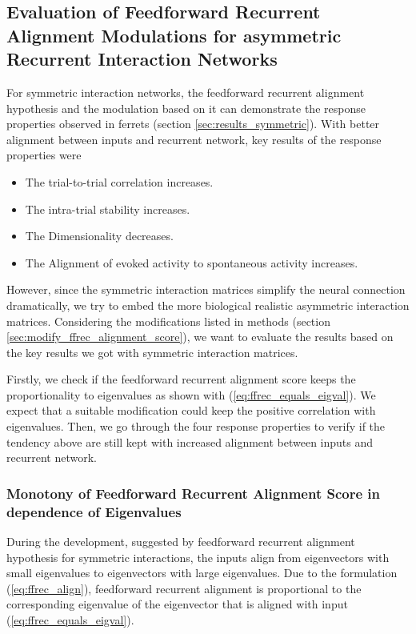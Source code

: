 \documentclass[11pt]{article}
\begin{document}
	\clearpage
	\subsection{Evaluation of Feedforward Recurrent Alignment Modulations for asymmetric Recurrent Interaction Networks} \label{sec:asymmetric_results}
	For symmetric interaction networks, the feedforward recurrent alignment hypothesis and the modulation based on it can demonstrate the response properties observed in ferrets \cite{tragenap2023nature} (section \ref{sec:results_symmetric}). With better alignment between inputs and recurrent network, key results of the response properties were
		\begin{itemize}
			\item The trial-to-trial correlation increases.
			\item The intra-trial stability increases.
			\item The Dimensionality decreases.
			\item The Alignment of evoked activity to spontaneous activity increases.
		\end{itemize}
	
	However, since the symmetric interaction matrices simplify the neural connection dramatically, we try to embed the more biological realistic asymmetric interaction matrices. Considering the modifications listed in methods (section \ref{sec:modify_ffrec_alignment_score}), we want to evaluate the results based on the key results we got with symmetric interaction matrices. 
	
	Firstly, we check if the feedforward recurrent alignment score keeps the proportionality to eigenvalues as shown with (\ref{eq:ffrec_equals_eigval}). We expect that a suitable modification could keep the positive correlation with eigenvalues. Then, we go through the four response properties to verify if the tendency above are still kept with increased alignment between inputs and recurrent network. 
	
	\subsubsection{Monotony of Feedforward Recurrent Alignment Score in dependence of Eigenvalues}
	
	During the development, suggested by feedforward recurrent alignment hypothesis for symmetric interactions, the inputs align from eigenvectors with small eigenvalues to eigenvectors with large eigenvalues. Due to the formulation (\ref{eq:ffrec_align}), feedforward recurrent alignment is proportional to the corresponding eigenvalue of the eigenvector that is aligned with input (\ref{eq:ffrec_equals_eigval}). 
	
\end{document}
